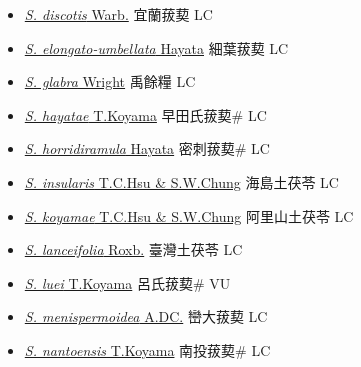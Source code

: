 \begin{itemize}
\begin{itemize}
        \item[] \href{http://www.theplantlist.org/tpl1.1/search?q=Smilax+discotis}{\textit{S. discotis} Warb.}   宜蘭菝葜 LC
        \item[] \href{http://www.theplantlist.org/tpl1.1/search?q=Smilax+elongato-umbellata}{\textit{S. elongato-umbellata} Hayata}   細葉菝葜 LC
        \item[] \href{http://www.theplantlist.org/tpl1.1/search?q=Smilax+glabra}{\textit{S. glabra} Wright}   禹餘糧 LC
        \item[] \href{http://www.theplantlist.org/tpl1.1/search?q=Smilax+hayatae}{\textit{S. hayatae} T.Koyama}   早田氏菝葜\# LC
        \item[] \href{http://www.theplantlist.org/tpl1.1/search?q=Smilax+horridiramula}{\textit{S. horridiramula} Hayata}   密刺菝葜\# LC
        \item[] \href{http://www.theplantlist.org/tpl1.1/search?q=Smilax+insularis}{\textit{S. insularis} T.C.Hsu \& S.W.Chung}   海島土茯苓 LC
        \item[] \href{http://www.theplantlist.org/tpl1.1/search?q=Smilax+koyamae}{\textit{S. koyamae} T.C.Hsu \& S.W.Chung}   阿里山土茯苓 LC
        \item[] \href{http://www.theplantlist.org/tpl1.1/search?q=Smilax+lanceifolia}{\textit{S. lanceifolia} Roxb.}   臺灣土茯苓 LC
        \item[] \href{http://www.theplantlist.org/tpl1.1/search?q=Smilax+luei}{\textit{S. luei} T.Koyama}   呂氏菝葜\# VU
        \item[] \href{http://www.theplantlist.org/tpl1.1/search?q=Smilax+menispermoidea}{\textit{S. menispermoidea} A.DC.}   巒大菝葜 LC
        \item[] \href{http://www.theplantlist.org/tpl1.1/search?q=Smilax+nantoensis}{\textit{S. nantoensis} T.Koyama}   南投菝葜\# LC

\end{itemize}
\end{itemize}
